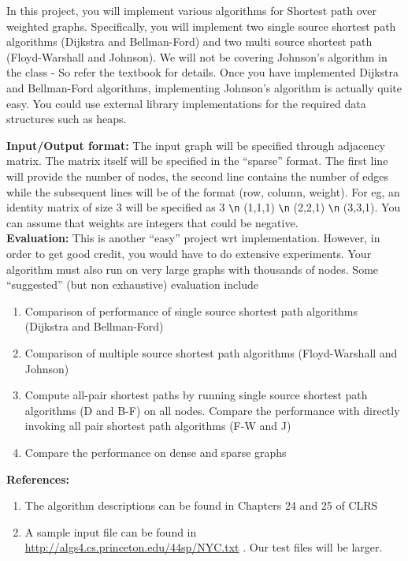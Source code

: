 \documentclass[12pt]{article}
\newcommand*{\escape}[1]{\texttt{\textbackslash#1}}
\begin{document}
In this project, you will implement various algorithms for Shortest path over weighted graphs.
Specifically, you will implement two single source shortest path algorithms (Dijkstra and Bellman-Ford)
and two multi source shortest path (Floyd-Warshall and Johnson).
We will not be covering Johnson's algorithm in the class - So refer the textbook for details.
Once you have implemented Dijkstra and Bellman-Ford algorithms, implementing Johnson's algorithm is actually quite easy. 
You could use external library implementations for the required data structures such as heaps.

{\bf Input/Output format:} The input graph will be specified through adjacency matrix. The matrix itself will be specified in the ``sparse'' format. The first line will provide the number of nodes,  the second line contains the number of edges while the subsequent lines will be of the format (row, column, weight). For eg, an identity matrix of size 3 will be specified as 3 \escape{n} (1,1,1) \escape{n} (2,2,1) \escape{n} (3,3,1). You can assume that weights are integers that could be negative.\\

{\bf Evaluation:}
This is another ``easy'' project wrt implementation. 
However, in order to get good credit, you would have to do extensive experiments.
Your algorithm must also run on very large graphs with thousands of nodes.
Some ``suggested'' (but non exhaustive) evaluation include
\begin{enumerate}
    \item Comparison of performance of single source shortest path algorithms (Dijkstra and Bellman-Ford)
    \item Comparison of multiple source shortest path algorithms (Floyd-Warshall and Johnson)
    \item Compute all-pair shortest paths by running single source shortest path algorithms (D and B-F) on all nodes. Compare the performance with directly invoking all pair shortest path algorithms (F-W and J)
    \item Compare the performance on dense and sparse graphs
\end{enumerate}

{\bf References:}
\begin{enumerate}
    \item The algorithm descriptions can be found in Chapters 24 and 25 of CLRS
    \item A sample input file can be found in \url{http://algs4.cs.princeton.edu/44sp/NYC.txt} . Our test files will be larger.
\end{enumerate}
\end{document}
